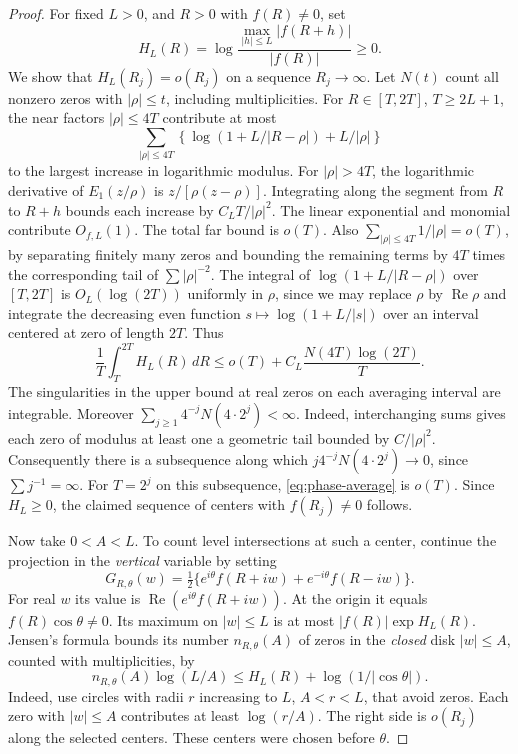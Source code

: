 \documentclass[11pt,a4paper]{article}
\numberwithin{equation}{section}
\renewcommand{\Re}{\operatorname{Re}}\renewcommand{\Im}{\operatorname{Im}}
\begin{document}
\begin{proof}
For fixed
$L>0$, and $R>0$ with $f(R)\ne0$, set
\[
 H_L(R)=\log\frac{\max_{|h|\le L}|f(R+h)|}{|f(R)|}\ge0.
\]
We show that $H_L(R_j)=o(R_j)$ on a sequence $R_j\to\infty$.
Let $N(t)$ count all nonzero zeros with $|\rho|\le t$, including
multiplicities. For $R\in[T,2T]$, $T\ge 2L+1$, the near factors
$|\rho|\le4T$ contribute at most
\[
 \sum_{|\rho|\le4T}
 \left\{\log(1+L/|R-\rho|)+ L/|\rho|\right\}
\]
to the largest increase in logarithmic modulus.
For $|\rho|>4T$, the logarithmic derivative of $E_1(z/\rho)$ is
$z/[\rho(z-\rho)]$. Integrating along the segment from $R$ to $R+h$
bounds each increase by $C_L T/|\rho|^2$. The linear exponential
and monomial contribute $O_{f,L}(1)$. The total far bound is $o(T)$.
Also $\sum_{|\rho|\le4T} 1/|\rho|=o(T)$, by separating finitely many
zeros and bounding the remaining terms by $4T$ times the corresponding
tail of $\sum|\rho|^{-2}$. The integral of
$\log(1+L/|R-\rho|)$ over $[T,2T]$ is $O_L(\log(2T))$ uniformly in
$\rho$, since we may replace $\rho$ by $\Re\rho$ and integrate the decreasing even
function $s\mapsto\log(1+L/|s|)$ over an interval centered at zero
of length $2T$. Thus
\begin{equation}\label{eq:phase-average}
 \frac1T\int_T^{2T} H_L(R)\,dR
 \le o(T)+C_L\frac{N(4T)\log(2T)}{T}.
\end{equation}
The singularities in the upper bound at real zeros on each averaging interval are
integrable. Moreover $\sum_{j\ge1}4^{-j}N(4\cdot2^j)<\infty$. Indeed,
interchanging sums gives each zero of modulus at least one a geometric
tail bounded by $C/|\rho|^2$. Consequently there is a subsequence along
which $j4^{-j}N(4\cdot2^j)\to0$, since $\sum j^{-1}=\infty$.
For $T=2^j$ on this subsequence, \eqref{eq:phase-average} is $o(T)$.
Since $H_L\ge0$, the claimed sequence of centers with $f(R_j)\ne0$
follows.

Now take $0<A<L$. To count level intersections at such a center,
continue the projection in the \emph{vertical} variable by setting
\[
 G_{R,\theta}(w)
 =\tfrac12\{e^{i\theta}f(R+iw)+e^{-i\theta}f(R-iw)\}.
\]
For real $w$ its value is $\Re(e^{i\theta}f(R+iw))$. At the origin it equals
$f(R)\cos\theta\ne0$. Its maximum on $|w|\le L$
is at most $|f(R)|\exp H_L(R)$. Jensen's formula bounds its number
$n_{R,\theta}(A)$ of zeros in the \emph{closed} disk $|w|\le A$, counted
with multiplicities, by
\begin{equation}\label{eq:phase-jensen}
 n_{R,\theta}(A)\log(L/A)
 \le H_L(R)+\log(1/|\cos\theta|).
\end{equation}
Indeed, use circles with radii $r$ increasing to $L$, $A<r<L$,
that avoid zeros. Each zero with $|w|\le A$ contributes at least
$\log(r/A)$. The right side is $o(R_j)$ along the selected centers. These centers were chosen before $\theta$.
\end{proof}
\end{document}
